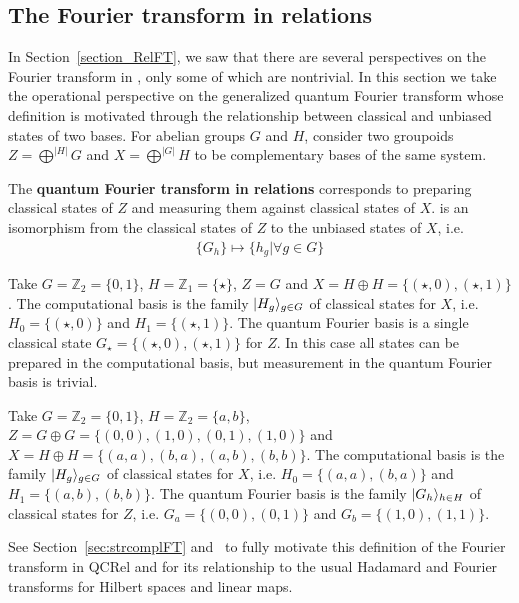 \subsection{The Fourier transform in relations}
\label{sec:RelFT}

In Section~\ref{section_RelFT}, we saw that there are several perspectives on the Fourier transform in , only some of which are nontrivial. In this section we take the operational perspective on the generalized quantum Fourier transform whose definition is motivated through the relationship between classical and unbiased states of two bases.  For abelian groups $G$ and $H$, consider two groupoids $Z=\bigoplus^{|H|}G$ and $X=\bigoplus^{|G|}H$ to be complementary bases of the same system.

\begin{defn}
\label{def:FTRel}
The \textbf{quantum Fourier transform in relations} corresponds to preparing classical states of $Z$ and measuring them against classical states of $X$.
is an isomorphism from the classical states of $Z$ to the unbiased states of $X$, i.e.
\begin{align*}
\{G_h\}\mapsto \{h_g|\forall g\in G\}
\end{align*}
\end{defn}

\begin{example}
Take $G=\mathbb{Z}_2=\{0,1\}$, $H=\mathbb{Z}_1=\{\star\}$, $Z = G$ and $X=H\oplus H = \{ (\star,0),(\star,1) \}$. The computational basis is the family $| H_g \rangle_{g\in G}$ of classical states for $X$, i.e. $H_0 = \{(\star,0)\}$ and $H_1 = \{(\star,1)\}$. The quantum Fourier basis is a single classical state $G_\star = \{(\star,0), (\star,1)\}$ for $Z$. In this case all states can be prepared in the computational basis, but  measurement in the quantum Fourier basis is trivial.
\end{example}

\begin{example}
Take $G=\mathbb{Z}_2=\{0,1\}$, $H=\mathbb{Z}_2=\{a,b\}$, $Z = G \oplus G = \{ (0,0),(1,0),(0,1),(1,0)\}$ and $X= H \oplus H = \{ (a,a), (b,a), (a,b), (b,b) \}$. The computational basis is the family $| H_g \rangle_{g \in G}$ of classical states for $X$, i.e. $H_0 = \{(a,a),(b,a)\}$ and $H_1 = \{(a,b),(b,b)\}$. The quantum Fourier basis is the family $| G_h \rangle_{h\in H}$ of classical states for $Z$, i.e. $G_a = \{(0,0),(0,1)\}$ and $G_b = \{(1,0),(1,1)\}$.
\end{example}

See Section~\ref{sec:strcomplFT} and~\cite{gogioso2015fourier} to fully motivate this definition of the Fourier transform in QCRel and for its relationship to the usual Hadamard and Fourier transforms for Hilbert spaces and linear maps.

